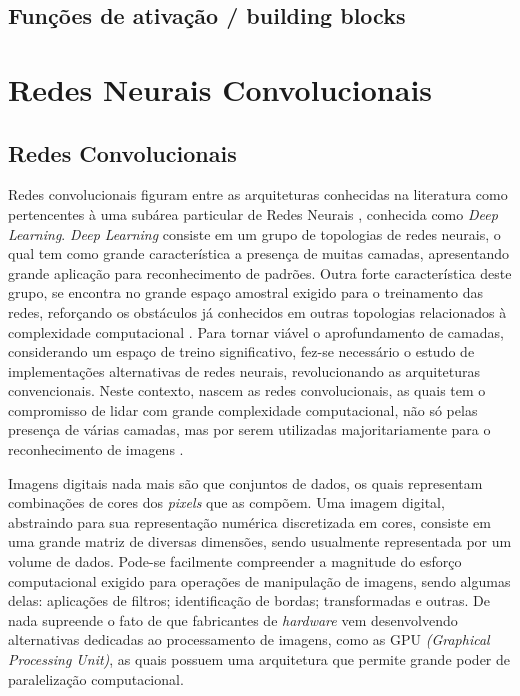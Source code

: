 \documentclass[
	12pt,				%
	oneside,			%
	a4paper,			%
	english,			%
	french,				%
	spanish,			%
	brazil,				%
	]{abntex2}
\begin{document}
\section{Funções de ativação / building blocks}

\chapter{Redes Neurais Convolucionais}

\section{Redes Convolucionais}
Redes convolucionais figuram entre as arquiteturas conhecidas na literatura como pertencentes à uma subárea particular de Redes Neurais , conhecida como \textit{Deep Learning}. \textit{Deep Learning} consiste em um grupo  de topologias de redes neurais, o qual tem como grande característica a presença de muitas camadas, apresentando grande aplicação para reconhecimento de padrões. Outra forte característica deste grupo, se encontra no grande espaço amostral exigido para o treinamento das redes, reforçando os obstáculos já conhecidos em outras topologias relacionados à complexidade computacional \cite{ref1}. Para tornar viável o aprofundamento de camadas, considerando um espaço de treino significativo, fez-se necessário o estudo de implementações alternativas de redes neurais, revolucionando as arquiteturas convencionais. Neste contexto, nascem as redes convolucionais, as quais tem o compromisso de lidar com grande complexidade computacional, não só pelas presença de várias camadas, mas por serem utilizadas majoritariamente para o reconhecimento de imagens \cite{ref3}.

Imagens digitais nada mais são que conjuntos de dados, os quais representam combinações de cores dos \textit{pixels} que as compõem. Uma imagem digital, abstraindo para sua representação numérica discretizada em cores, consiste em uma grande matriz de diversas dimensões, sendo usualmente representada por um volume de dados. Pode-se facilmente compreender a magnitude do esforço computacional exigido para operações de manipulação de imagens, sendo algumas delas: aplicações de filtros; identificação de bordas; transformadas e outras. De nada supreende o fato de que fabricantes de \textit{hardware} vem desenvolvendo alternativas dedicadas ao processamento de imagens, como as GPU \textit{(Graphical Processing Unit)}, as quais possuem uma arquitetura que permite grande poder de paralelização computacional.
\end{document}

